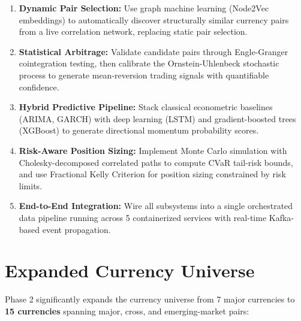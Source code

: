 \documentclass[letterpaper,11pt]{report}
\begin{document}
\begin{enumerate}
    \item \textbf{Dynamic Pair Selection:} Use graph machine learning (Node2Vec embeddings) to automatically discover structurally similar currency pairs from a live correlation network, replacing static pair selection.
    \item \textbf{Statistical Arbitrage:} Validate candidate pairs through Engle-Granger cointegration testing, then calibrate the Ornstein-Uhlenbeck stochastic process to generate mean-reversion trading signals with quantifiable confidence.
    \item \textbf{Hybrid Predictive Pipeline:} Stack classical econometric baselines (ARIMA, GARCH) with deep learning (LSTM) and gradient-boosted trees (XGBoost) to generate directional momentum probability scores.
    \item \textbf{Risk-Aware Position Sizing:} Implement Monte Carlo simulation with Cholesky-decomposed correlated paths to compute CVaR tail-risk bounds, and use Fractional Kelly Criterion for position sizing constrained by risk limits.
    \item \textbf{End-to-End Integration:} Wire all subsystems into a single orchestrated data pipeline running across 5 containerized services with real-time Kafka-based event propagation.
\end{enumerate}

\section{Expanded Currency Universe}

Phase 2 significantly expands the currency universe from 7 major currencies to \textbf{15 currencies} spanning major, cross, and emerging-market pairs:
\end{document}
